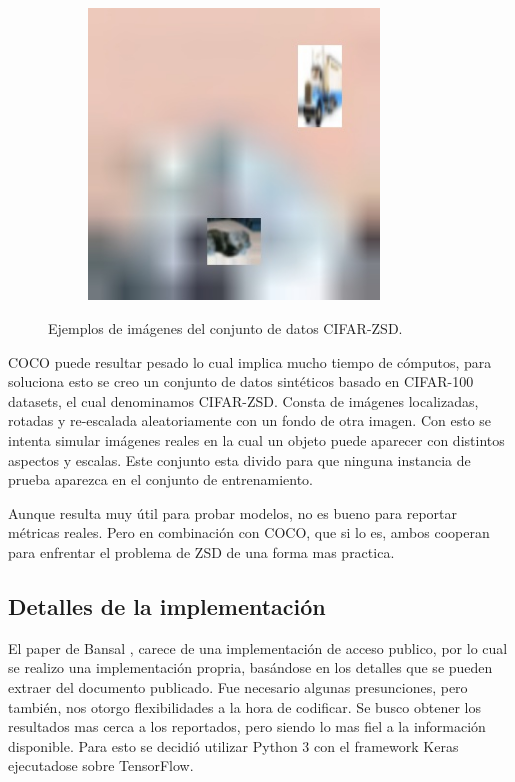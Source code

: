 \begin{figure}[H]
\begin{center}
	\begin{subfigure}{.3\textwidth}
		\includegraphics[width=0.85\textwidth]{img/cifar-zsd-test283.jpg}
		\label{fig:ex3}
	\end{subfigure}
	\caption{Ejemplos de imágenes del conjunto de datos CIFAR-ZSD.}
	\label{fig:CIFAR-ZSD}
	\end{center}
\end{figure}

COCO puede resultar pesado lo cual implica mucho tiempo de cómputos, para soluciona esto se creo un conjunto de datos sintéticos basado en CIFAR-100 datasets, el cual denominamos CIFAR-ZSD. Consta de imágenes localizadas, rotadas y re-escalada aleatoriamente con un fondo de otra imagen. Con esto se intenta simular imágenes reales en la cual un objeto puede aparecer con distintos aspectos y escalas. Este conjunto esta divido para que ninguna instancia de prueba  aparezca en el conjunto de entrenamiento.

Aunque resulta muy útil para probar modelos, no es bueno para reportar métricas reales. Pero en combinación con COCO, que si lo es, ambos cooperan para enfrentar el problema de ZSD de una forma mas practica.

\subsection{Detalles de la implementación} \label{ssec:detallesdelaimplementacion}

El paper de Bansal \cite{bansal2018zero}, carece de una implementación de acceso publico, por lo cual se realizo una implementación propria, basándose en los detalles que se pueden extraer del documento publicado. Fue necesario algunas presunciones, pero también, nos otorgo flexibilidades a la hora de codificar. Se busco obtener los resultados mas cerca a los reportados, pero siendo lo mas fiel a la información disponible. Para esto se decidió utilizar Python 3 con el framework Keras ejecutadose sobre TensorFlow.\\

